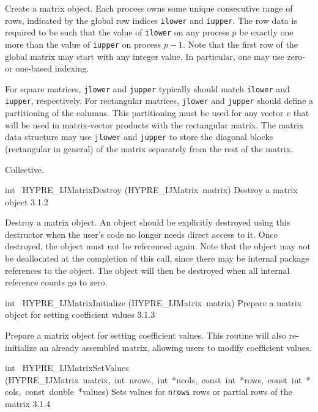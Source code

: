 \documentclass{article}
\begin{document}
\begin{cxxentry}
\begin{cxxentry}
\begin{cxxfunction}
\begin{cxxdoc}
Create a matrix object.  Each process owns some unique consecutive
range of rows, indicated by the global row indices {\tt ilower} and
{\tt iupper}.  The row data is required to be such that the value
of {\tt ilower} on any process $p$ be exactly one more than the
value of {\tt iupper} on process $p-1$.  Note that the first row of
the global matrix may start with any integer value.  In particular,
one may use zero- or one-based indexing.

For square matrices, {\tt jlower} and {\tt jupper} typically should
match {\tt ilower} and {\tt iupper}, respectively.  For rectangular
matrices, {\tt jlower} and {\tt jupper} should define a
partitioning of the columns.  This partitioning must be used for
any vector $v$ that will be used in matrix-vector products with the
rectangular matrix.  The matrix data structure may use {\tt jlower}
and {\tt jupper} to store the diagonal blocks (rectangular in
general) of the matrix separately from the rest of the matrix.

Collective.
\end{cxxdoc}
\end{cxxfunction}
\begin{cxxfunction}
{int\ }
        {HYPRE\_IJMatrixDestroy}
        {(HYPRE\_IJMatrix\ matrix)}
        {
Destroy a matrix object}
        {3.1.2}
\begin{cxxdoc}

Destroy a matrix object.  An object should be explicitly destroyed
using this destructor when the user's code no longer needs direct
access to it.  Once destroyed, the object must not be referenced
again.  Note that the object may not be deallocated at the
completion of this call, since there may be internal package
references to the object.  The object will then be destroyed when
all internal reference counts go to zero.
\end{cxxdoc}
\end{cxxfunction}
\begin{cxxfunction}
{int\ }
        {HYPRE\_IJMatrixInitialize}
        {(HYPRE\_IJMatrix\ matrix)}
        {
Prepare a matrix object for setting coefficient values}
        {3.1.3}
\begin{cxxdoc}

Prepare a matrix object for setting coefficient values.  This
routine will also re-initialize an already assembled matrix,
allowing users to modify coefficient values.
\end{cxxdoc}
\end{cxxfunction}
\begin{cxxfunction}
{int\ }
        {HYPRE\_IJMatrixSetValues}
        {(HYPRE\_IJMatrix\ matrix,\ int\ nrows,\ int\ *ncols,\ const\ int\ *rows,\ const\ int\ *cols,\ const\ double\ *values)}
        {
Sets values for {\tt nrows} rows or partial rows of the matrix}
        {3.1.4}
\begin{cxxdoc}


\end{cxxdoc}
\end{cxxfunction}
\end{cxxentry}
\end{cxxentry}
\end{document}
